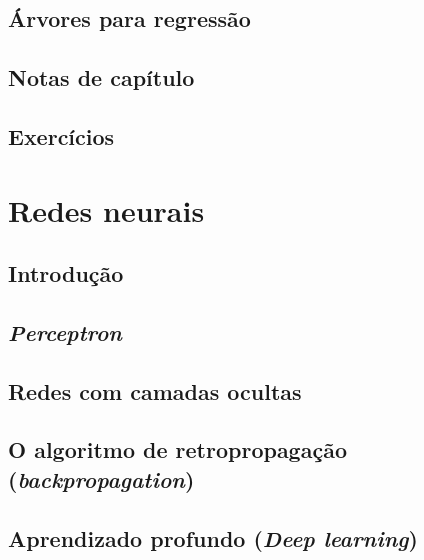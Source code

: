 \documentclass[
]{latex/krantz}
\theoremstyle{definition}
\theoremstyle{definition}
\theoremstyle{definition}
\theoremstyle{definition}
\theoremstyle{remark}
\begin{document}
\hypertarget{uxe1rvores-para-regressuxe3o}{%
\section{Árvores para regressão}\label{uxe1rvores-para-regressuxe3o}}

\hypertarget{notas-de-capuxedtulo-9}{%
\section{Notas de capítulo}\label{notas-de-capuxedtulo-9}}

\hypertarget{exercuxedcios-9}{%
\section{Exercícios}\label{exercuxedcios-9}}

\hypertarget{redes-neurais}{%
\chapter{Redes neurais}\label{redes-neurais}}

\hypertarget{introduuxe7uxe3o-10}{%
\section{Introdução}\label{introduuxe7uxe3o-10}}

\hypertarget{perceptron}{%
\section{\texorpdfstring{\emph{Perceptron}}{Perceptron}}\label{perceptron}}

\hypertarget{redes-com-camadas-ocultas}{%
\section{Redes com camadas ocultas}\label{redes-com-camadas-ocultas}}

\hypertarget{o-algoritmo-de-retropropagauxe7uxe3o-backpropagation}{%
\section{\texorpdfstring{O algoritmo de retropropagação (\emph{backpropagation})}{O algoritmo de retropropagação (backpropagation)}}\label{o-algoritmo-de-retropropagauxe7uxe3o-backpropagation}}

\hypertarget{aprendizado-profundo-deep-learning}{%
\section{\texorpdfstring{Aprendizado profundo (\emph{Deep learning})}{Aprendizado profundo (Deep learning)}}\label{aprendizado-profundo-deep-learning}}
\end{document}
